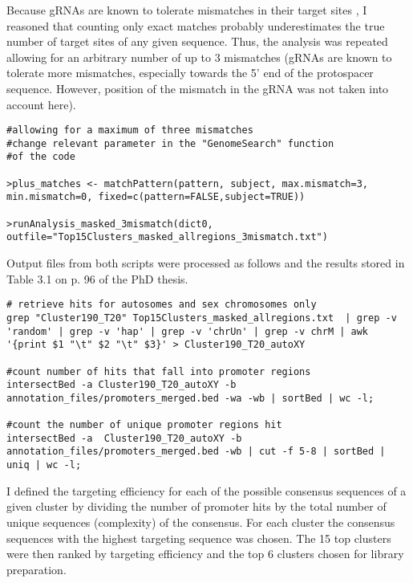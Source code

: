 Because gRNAs are known to tolerate mismatches in their target sites \cite{Mali:2013ft}, I reasoned that counting only exact matches probably underestimates the true number of target sites of any given sequence. Thus, the analysis was repeated allowing for an arbitrary number of up to 3 mismatches (gRNAs are known to tolerate more mismatches, especially towards the 5' end of the protospacer sequence. However, position of the mismatch in the gRNA was not taken into account here).

\begin{small}\begin{lstlisting}
#allowing for a maximum of three mismatches
#change relevant parameter in the "GenomeSearch" function 
#of the code

>plus_matches <- matchPattern(pattern, subject, max.mismatch=3, min.mismatch=0, fixed=c(pattern=FALSE,subject=TRUE))

>runAnalysis_masked_3mismatch(dict0, outfile="Top15Clusters_masked_allregions_3mismatch.txt")
\end{lstlisting}\end{small}

Output files from both scripts were processed as follows and the results stored in Table 3.1 on p. 96 of the PhD thesis.

\begin{small}\begin{lstlisting}
# retrieve hits for autosomes and sex chromosomes only
grep "Cluster190_T20" Top15Clusters_masked_allregions.txt  | grep -v 'random' | grep -v 'hap' | grep -v 'chrUn' | grep -v chrM | awk '{print $1 "\t" $2 "\t" $3}' > Cluster190_T20_autoXY 

#count number of hits that fall into promoter regions
intersectBed -a Cluster190_T20_autoXY -b annotation_files/promoters_merged.bed -wa -wb | sortBed | wc -l;    

#count the number of unique promoter regions hit
intersectBed -a  Cluster190_T20_autoXY -b  annotation_files/promoters_merged.bed -wb | cut -f 5-8 | sortBed | uniq | wc -l;
\end{lstlisting}\end{small}

I defined the targeting efficiency for each of the possible consensus sequences of a given cluster by dividing the number of promoter hits by the total number of unique sequences (complexity) of the consensus. For each cluster the consensus sequences with the highest targeting sequence was chosen. The 15 top clusters were then ranked by targeting efficiency and the top 6 clusters chosen for library preparation.
